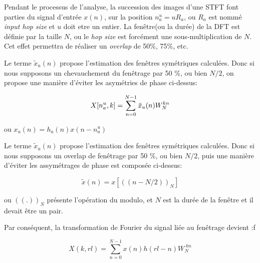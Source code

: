 Pendant le processus de l'analyse, la succession des images d'une STFT font parties du signal d'entrée $x(n)$, sur la position $n_a^u = uR_a$, ou $R_a$ est nommé \textit{input hop size} et $u$ doit etre un entier. La fenêtre(ou la durée) de la DFT est définie par la taille $N$, ou le \textit{hop size} est forcément une sous-multiplication de $N$. Cet effet permettra de réaliser un \textit{overlap} de 50\%, 75\%, etc.

Le terme $\tilde{x}_u(n)$ propose l'estimation des fenêtres symétriques calculées. Donc si nous supposons un chevauchement du fenêtrage par 50 \%, ou bien $N/2$, on propose une manière d'éviter les asymétries de phase ci-dessus:  

\begin{equation}
    X[n_a^u, k] = \sum_{n=0} ^{N-1} \tilde{x}_u(n) W_N^{kn} \vspace{0.5cm} 
\end{equation}

\hspace{5cm} ou \hspace{1cm} ${x}_u(n) = h_a(n) x(n-n_a^u)$ 

Le terme $\tilde{x}_u(n)$ propose l'estimation des fenêtres symétriques calculées. Donc si nous supposons un overlap de fenêtrage par 50 \%, ou bien $N/2$, puis une manière d’éviter les assymétrages de phase est composée ci-dessus:  

\begin{equation}
    \tilde{x}(n) = x[((n-N/2))_N] 
\end{equation}

ou $((.))_N$ présente l'opération du modulo, et $N$ est la durée de la fenêtre et il devait être un pair.


Par conséquent, la transformation de Fourier du signal liée au fenêtrage devient :f

\begin{equation}
    X(k, rl) = \sum_{n=0}^{N-1} x(n) h(rl-n)  W_N^{\; k n}
\end{equation}


